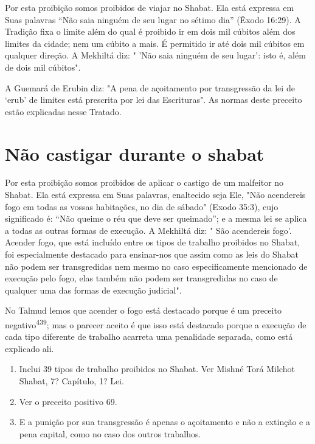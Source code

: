 Por esta proibição somos proibidos de viajar no Shabat. Ela está
ex­pressa em Suas palavras ``Não saia ninguém de seu lugar no sétimo dia''
(Êxodo 16:29). A Tradição fixa o limite além do qual é proibido ir em
dois mil cúbitos além dos limites da cidade; nem um cúbito a mais. É
permitido ir até dois mil cúbitos em qualquer direção. A Mekhiltá diz: "
'Não saia ninguém de seu lu­gar': isto é, além de dois mil cúbitos".

A Guemará de Erubin diz: "A pena de açoitamento por transgressão da lei
de `erub' de limites está prescrita por lei das Escrituras". As normas
deste preceito estão explicadas nesse Tratado.


\section{Não castigar durante o shabat}


Por esta proibição somos proibidos de aplicar o castigo de um mal­feitor
no Shabat. Ela está expressa em Suas palavras, enaltecido seja Ele, "Não
acendereis fogo em todas as vossas habitações, no dia de sábado" (Exodo
35:3), cujo significado é: ``Não queime o réu que deve ser queimado''; e a
mesma lei se aplica a todas as outras formas de execução. A Mekhiltá
diz: " São acende­reis fogo'. Acender fogo, que está incluído entre os
tipos de trabalho proibidos no Shabat, foi especialmente destacado para
ensinar-nos que assim como as leis do Shabat não podem ser transgredidas
nem mesmo no caso especificamente mencionado de execução pelo fogo, elas
também não podem ser transgredidas no caso de qualquer uma das formas de
execução judicial".

No Talmud lemos que acender o fogo está destacado porque é um preceito
negativo\textsuperscript{439}; mas o parecer aceito é que isso está
destacado porque a execução de cada tipo diferente de trabalho acarreta
uma penalidade separada, como está explicado ali.


\begin{enumerate}
\def\labelenumi{\arabic{enumi}.}
\setcounter{enumi}{436}
\item
 
 Inclui 39 tipos de trabalho proibidos no Shabat. Ver Mishné Torá
 Milchot Shabat, 7? Capítu­lo, 1? Lei.
 
\item
 
 Ver o preceito positivo 69.
 
\item
 
 E a punição por sua transgressão é apenas o açoitamento e não a
 extinção e a pena capital, como no caso dos outros trabalhos.
 
\end{enumerate}


